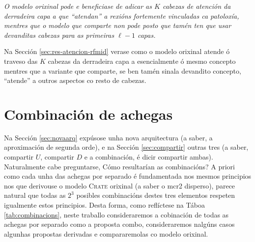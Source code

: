 \begin{center}
\begin{minipage}{0.8\textwidth}
\centering
\emph{O modelo orixinal pode e beneficiase de adicar as $K$ cabezas de atención da derradeira capa a que ``atendan'' a rexións fortemente vinculadas ca patoloxía, mentres que o modelo que comparte non pode posto que tamén ten que usar devanditas cabezas para as primeiras $\ell -1$ capas.}
\end{minipage}
\end{center}

Na Sección \ref{sec:res-atencion-rfmid} verase como o modelo orixinal atende ó traveso das $K$ cabezas da derradeira capa a esencialmente ó mesmo concepto mentres que a variante que comparte, se ben tamén sinala devandito concepto, ``atende'' a outros aspectos co resto de cabezas.

\section{Combinación de achegas}
\label{sec:combinacions}

Na Sección \ref{sec:novaarq} expúsose unha nova arquitectura  (a saber, a aproximación de segunda orde), e na Sección \ref{sec:compartir} outras tres (a saber, compartir $U$, compartir $D$ e a combinación, é dicir compartir ambas). Naturalmente cabe preguntarse, Cómo resultarían as combinacións? A priori como cada unha das achegas por separado é fundamentada nos mesmos principios nos que derivouse o modelo \textsc{Crate} orixinal (a saber o \acrshort{mcr2} disperso), parece natural que todas as $2^3$ posibles combinacións destes tres elementos respeten igualmente estos principios. Desta forma, como reflíctese na Táboa \ref{tab:combinacions}, neste traballo consideraremos a cobinación de todas as achegas por separado como a proposta \textcolor{udcpink}{combo}, consideraremos nalgúns casos algunhas propostas \textcolor{ficblue}{derivadas} e compararemolas co modelo \textcolor{udcgray}{orixinal}.

